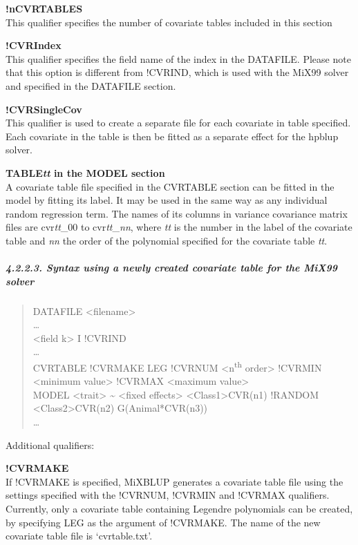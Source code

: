 \textbf{!nCVRTABLES}\\
This qualifier specifies the number of covariate tables included in this
section

\textbf{!CVRIndex}\\
This qualifier specifies the field name of the index in the DATAFILE.
Please note that this option is different from !CVRIND, which is used
with the MiX99 solver and specified in the DATAFILE section.

\textbf{!CVRSingleCov}\\
This qualifier is used to create a separate file for each covariate in
table specified. Each covariate in the table is then be fitted as a
separate effect for the hpblup solver.

\textbf{TABLE\emph{tt} in the MODEL section}\\
A covariate table file specified in the CVRTABLE section can be fitted
in the model by fitting its label. It may be used in the same way as any
individual random regression term. The names of its columns in variance
covariance matrix files are cvr\emph{tt}\_00 to cvr\emph{tt}\_\emph{nn},
where \emph{tt} is the number in the label of the covariate table and
\emph{nn} the order of the polynomial specified for the covariate table
\emph{tt}.

\subparagraph{4.2.2.3. Syntax using a newly created covariate table for
the MiX99 solver}\label{Obse12}

\begin{quote}
DATAFILE \textless filename\textgreater{}\\
\ldots{}\\
\textless field k\textgreater{} I !CVRIND\\
\ldots{}\\
CVRTABLE !CVRMAKE LEG !CVRNUM \textless n\textsuperscript{th}
order\textgreater{} !CVRMIN \textless minimum value\textgreater{}
!CVRMAX \textless maximum value\textgreater{}\\
MODEL \textless trait\textgreater{} \textasciitilde{} \textless fixed
effects\textgreater{} \textless Class1\textgreater*CVR(n1) !RANDOM
\textless Class2\textgreater*CVR(n2) G(Animal*CVR(n3))\\
\ldots{}
\end{quote}

Additional qualifiers:

\textbf{!CVRMAKE}\\
If !CVRMAKE is specified, MiXBLUP generates a covariate table file using
the settings specified with the !CVRNUM, !CVRMIN and !CVRMAX qualifiers.
Currently, only a covariate table containing Legendre polynomials can be
created, by specifying LEG as the argument of !CVRMAKE. The name of the
new covariate table file is `cvrtable.txt'.

